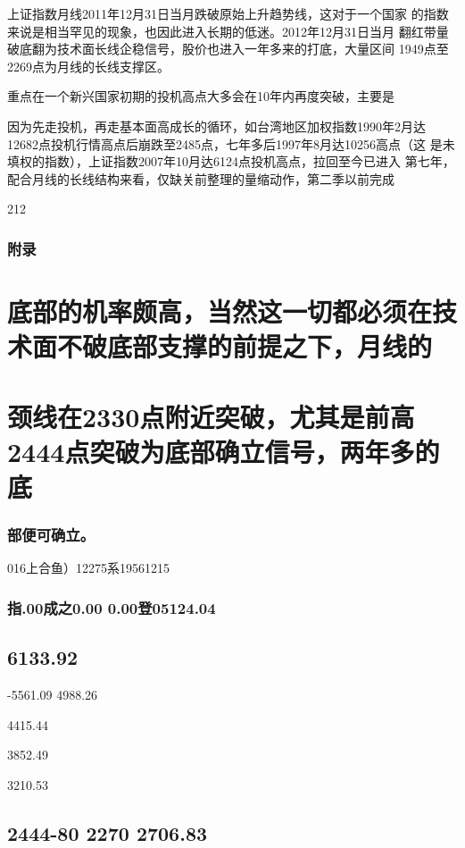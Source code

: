 \documentclass{article}
\begin{document}
上证指数月线2011年12月31日当月跌破原始上升趋势线，这对于一个国家 的指数来说是相当罕见的现象，也因此进入长期的低迷。2012年12月31日当月 翻红带量破底翻为技术面长线企稳信号，股价也进入一年多来的打底，大量区间 1949点至2269点为月线的长线支撑区。

重点在一个新兴国家初期的投机高点大多会在10年内再度突破，主要是

因为先走投机，再走基本面高成长的循环，如台湾地区加权指数1990年2月达 12682点投机行情高点后崩跌至2485点，七年多后1997年8月达10256高点（这 是未填权的指数），上证指数2007年10月达6124点投机高点，拉回至今已进入 第七年，配合月线的长线结构来看，仅缺关前整理的量缩动作，第二季以前完成

212

\clearpage

\subsubsection{附录}

\section{底部的机率颇高，当然这一切都必须在技术面不破底部支撑的前提之下，月线的}

\section{颈线在2330点附近突破，尤其是前高2444点突破为底部确立信号，两年多的底}

\subsubsection{部便可确立。}

016上合鱼）12275系19561215

\subsubsection{指.00成之0.00 0.00登05124.04}

\subsection{6133.92}

-5561.09 4988.26

4415.44

3852.49

3210.53

\subsection{2444-80 2270 2706.83}
\end{document}
